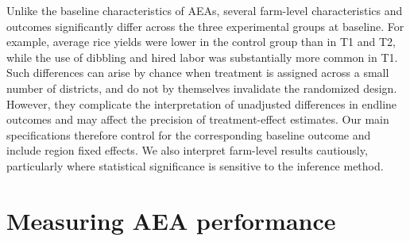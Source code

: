 \documentclass[11pt]{article}
\begin{document}
Unlike the baseline characteristics of AEAs, several farm-level characteristics and outcomes significantly differ across the three experimental groups at baseline. For example, average rice yields were lower in the control group than in T1 and T2, while the use of dibbling and hired labor was substantially more common in T1. Such differences can arise by chance when treatment is assigned across a small number of districts, and do not by themselves invalidate the randomized design. However, they complicate the interpretation of unadjusted differences in endline outcomes and may affect the precision of treatment-effect estimates. Our main specifications therefore control for the corresponding baseline outcome and include region fixed effects. We also interpret farm-level results cautiously, particularly where statistical significance is sensitive to the inference method.





\section{Measuring AEA performance}\label{sec:performance}
\end{document}
